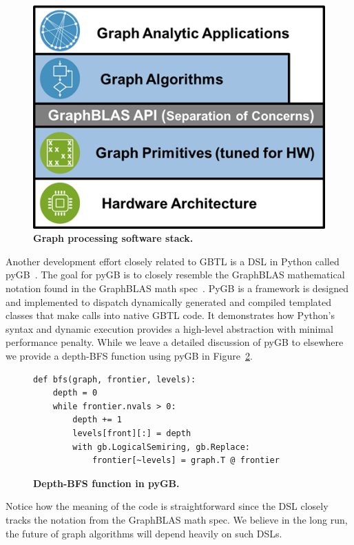 \begin{figure}[t]
\includegraphics[width=\linewidth]{fig/gbtl}
\caption{\textbf{Graph processing software stack.}\label{fig:gbtl}}
\end{figure}


Another development effort closely related to GBTL is a DSL in Python called pyGB~\cite{Chamberlin2016}.  
The goal for pyGB is to closely resemble the GraphBLAS mathematical notation found in the GraphBLAS math spec~\cite{mathgraphblas16}.  
PyGB is a framework is designed and implemented to dispatch dynamically generated and compiled templated 
classes that make calls into native GBTL code.  It demonstrates how Python's syntax and dynamic execution provides 
a high-level abstraction with minimal performance penalty.  While we leave a detailed discussion of pyGB to elsewhere~\cite{Chamberlin2016}
we provide a depth-BFS function using pyGB in Figure~\ref{code:pyGB}.
%
\begin{figure}[t]
{\small
\begin{verbatim}
def bfs(graph, frontier, levels):
    depth = 0
    while frontier.nvals > 0:
        depth += 1
        levels[front][:] = depth
        with gb.LogicalSemiring, gb.Replace:
            frontier[~levels] = graph.T @ frontier 
\end{verbatim}
}
\caption{\textbf{Depth-BFS function in pyGB.}\label{code:pyGB}}
\end{figure}
%
%
%
Notice how the meaning of the code
is straightforward since the DSL closely tracks the notation from the GraphBLAS math spec.  We believe in the long run, the 
future of graph algorithms will depend heavily on such DSLs.


